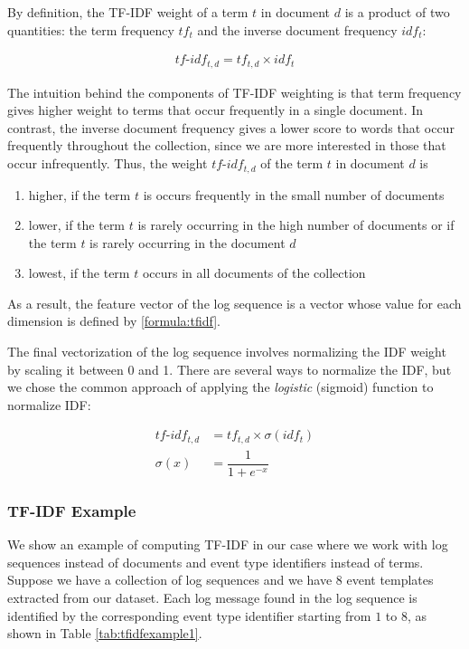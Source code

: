 By definition, the TF-IDF weight of a term $t$ in document $d$ is a product of two quantities: the term frequency $tf_t$ and the inverse document frequency $idf_t$:

\begin{gather}
    tf\text{-}idf_{t, d} = tf_{t,d} \times idf_t
    \label{formula:tfidf}
\end{gather}

The intuition behind the components of TF-IDF weighting is that term frequency gives higher weight to terms that occur frequently in a single document. In contrast, the inverse document frequency gives a lower score to words that occur frequently throughout the collection, since we are more interested in those that occur infrequently. Thus, the weight $tf\text{-}idf_{t, d}$ of the term $t$ in document $d$ is 

\begin{enumerate}
    \item higher, if the term $t$ is occurs frequently in the small number of documents
    \item lower, if the term $t$ is rarely occurring in the high number of documents or if the term $t$ is rarely occurring in the document $d$
    \item lowest, if the term $t$ occurs in all documents of the collection
\end{enumerate}

As a result, the feature vector of the log sequence is a vector whose value for each dimension is defined by \ref{formula:tfidf}.

The final vectorization of the log sequence involves normalizing the IDF weight by scaling it between 0 and 1. There are several ways to normalize the IDF, but we chose the common approach of applying the \textit{logistic} (sigmoid) function to normalize IDF:

\begin{align*}
    tf\text{-}idf_{t, d} &= tf_{t,d} \times \sigma(idf_t) \\
    \sigma(x) &= \dfrac{1}{1 + e^{-x}}
\end{align*}

\subsubsection*{TF-IDF Example}
We show an example of computing TF-IDF in our case where we work with log sequences instead of documents and event type identifiers instead of terms. Suppose we have a collection of log sequences and we have $8$ event templates extracted from our dataset. Each log message found in the log sequence is identified by the corresponding event type identifier starting from $1$ to $8$, as shown in Table \ref{tab:tfidfexample1}.

